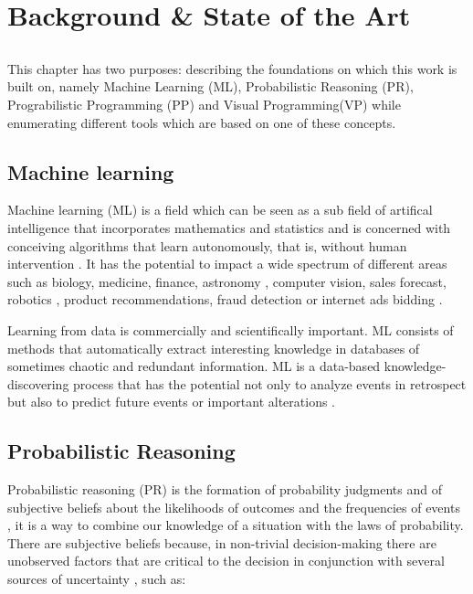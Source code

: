 \chapter{Background \& State of the Art} \label{chap:sota}

\section*{}

This chapter has two purposes: describing the foundations on which this work
is built on, namely Machine Learning (ML), Probabilistic Reasoning (PR),
Prograbilistic Programming (PP) and
Visual Programming(VP) while enumerating different tools which are based
on one of these concepts.

\section{Machine learning}

Machine learning (ML) is a field which can be seen as a sub field of artifical
intelligence that incorporates mathematics and statistics and is concerned
with conceiving algorithms that learn autonomously, that is, without human
intervention \cite{mlbrit}\cite{mlnot}.
It has the potential to impact a wide spectrum of
different areas such as biology, medicine, finance, astronomy
\cite{Amatriain:2013:BDU:2541176.2514691}, computer vision, sales forecast,
robotics \cite{intml}, product recommendations, fraud detection or
internet ads bidding \cite{SciPy}.

Learning from data is commercially and scientifically important. ML consists of
methods that automatically extract interesting knowledge in databases of sometimes chaotic and
redundant information. ML is a data-based knowledge-discovering process that
has the potential not only to analyze events in retrospect but also to predict
future events or important alterations \cite{mapt}.

\section{Probabilistic Reasoning}

Probabilistic reasoning (PR) is the formation of probability judgments and of
subjective beliefs about the likelihoods of outcomes and the frequencies of
events \cite{Lassiter2012}, it is a way to combine our knowledge of a situation
with the laws of probability. There are subjective beliefs because, in non-trivial
decision-making there are unobserved factors that are critical to the decision
in conjunction with several sources of uncertainty \cite{reas}, such as:

